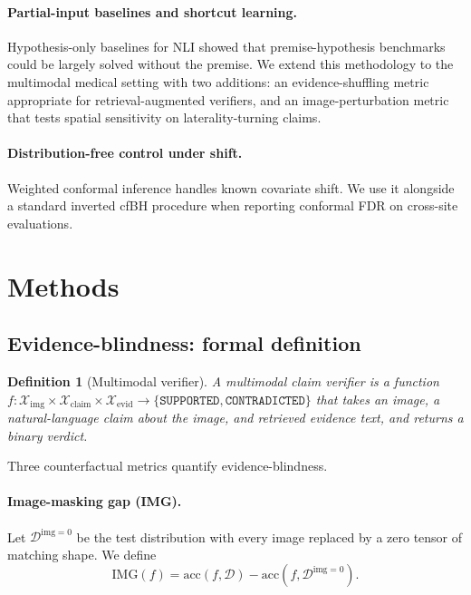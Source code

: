\documentclass[pmlr]{jmlr}
\newtheorem{ebdefn}{Definition}
\begin{document}
\paragraph{Partial-input baselines and shortcut learning.} Hypothesis-only baselines for NLI \citep{gururangan2018annotation,poliak2018hypothesis} showed that premise-hypothesis benchmarks could be largely solved without the premise. We extend this methodology to the multimodal medical setting with two additions: an evidence-shuffling metric appropriate for retrieval-augmented verifiers, and an image-perturbation metric that tests spatial sensitivity on laterality-turning claims.

\paragraph{Distribution-free control under shift.} Weighted conformal inference \citep{tibshirani2019conformal} handles known covariate shift. We use it alongside a standard inverted cfBH procedure when reporting conformal FDR on cross-site evaluations.

\section{Methods}

\subsection{Evidence-blindness: formal definition}

\begin{ebdefn}[Multimodal verifier]
A \emph{multimodal claim verifier} is a function $f: \mathcal{X}_{\text{img}} \times \mathcal{X}_{\text{claim}} \times \mathcal{X}_{\text{evid}} \to \{\texttt{SUPPORTED}, \texttt{CONTRADICTED}\}$ that takes an image, a natural-language claim about the image, and retrieved evidence text, and returns a binary verdict.
\end{ebdefn}

Three counterfactual metrics quantify evidence-blindness.

\paragraph{Image-masking gap (IMG).} Let $\mathcal{D}^{\text{img}=0}$ be the test distribution with every image replaced by a zero tensor of matching shape. We define
\[
\text{IMG}(f) = \text{acc}(f, \mathcal{D}) - \text{acc}(f, \mathcal{D}^{\text{img}=0}).
\]
\end{document}
